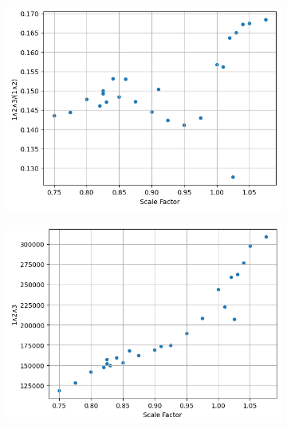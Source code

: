 \documentclass[11pt,a4paper]{article}
\begin{document}
\begin{figure}
\centering
\begin{subfigure}[b]{0.45\textwidth}
\centering
\includegraphics[width=\textwidth]{beam_optimization_1.png}
\caption{}

\end{subfigure}
    \hfill
    \begin{subfigure}[b]{0.45\textwidth}
        \centering
        \includegraphics[width=\textwidth]{beam_optimization_2.png}
        \caption{}


\end{subfigure}
\end{figure}
\end{document}
